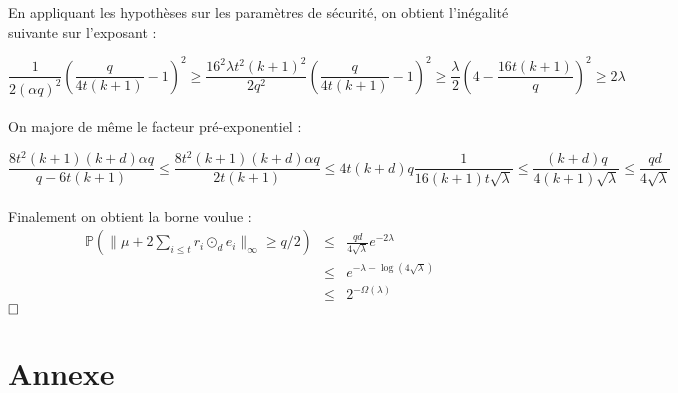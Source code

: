 \documentclass[11pt,a4paper]{article}
\begin{document}
En appliquant les hypothèses sur les paramètres de sécurité, on obtient l'inégalité suivante sur l'exposant :

\[
\frac{1}{2(\alpha q)^2}(\frac{q}{4t(k+1)}-1)^2 \geq \frac{16^2\lambda t^2(k+1)^2}{2q^2}(\frac{q}{4t(k+1)}-1)^2 
\geq \frac{\lambda}{2}(4-\frac{16t(k+1)}{q})^2
\geq 2\lambda
\]
\\

On majore de même le facteur pré-exponentiel : 

\[
\frac{8t^2(k+1)(k+d)\alpha q}{q - 6t(k+1)} \leq \frac{8t^2(k+1)(k+d)\alpha q}{2t(k+1)}
\leq 4t(k+d)q\frac{1}{16(k+1)t\sqrt{\lambda}} 
\leq \frac{(k+d)q}{4(k+1)\sqrt{\lambda}}
\leq \frac{qd}{4\sqrt{\lambda}}
\]
\\

Finalement on obtient la borne voulue :
\begin{eqnarray*}
\mathbb{P}(\|\mu + 2\sum_{i \leq t}r_i \odot_d e_i  \|_\infty \geq q/2 ) &\leq&  \frac{qd}{4\sqrt{\lambda}}e^{-2\lambda} \\
&\leq& e^{-\lambda-\log(4\sqrt{\lambda})} \\
&\leq& 2^{-\Omega(\lambda)}
\end{eqnarray*}
$\hfill \square$


\section*{Annexe}
\printbibliography[heading=bibintoc, title={Références}]
\end{document}
